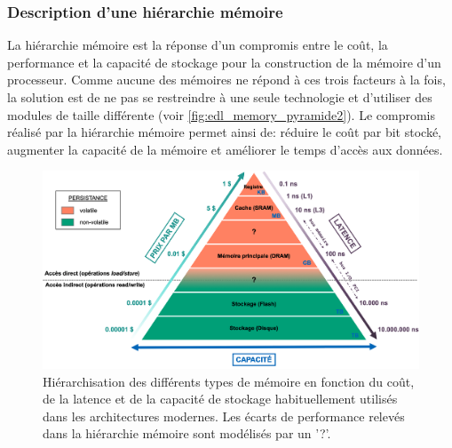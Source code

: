         
    \subsubsection{Description d'une hiérarchie mémoire} 
    
        
        La hiérarchie mémoire est la réponse d'un compromis entre le coût, la performance et la capacité de stockage pour la construction de la mémoire d'un processeur. Comme aucune des mémoires ne répond à ces trois facteurs à la fois, la solution est de ne pas se restreindre à  une seule technologie et d'utiliser des modules de taille différente (voir \autoref{fig:edl_memory_pyramide2}). Le compromis réalisé par la hiérarchie mémoire permet ainsi de: réduire le coût par bit stocké, augmenter la capacité de la mémoire et améliorer le temps d'accès aux données. 
        
        \begin{figure}
            \center
            \includegraphics[width=17cm]{images/edl_memory_pyramide.png}
            \caption{\label{fig:edl_memory_pyramide2} Hiérarchisation des différents types de mémoire en fonction du coût, de la latence et de la capacité de stockage habituellement utilisés dans les architectures modernes. Les écarts de performance relevés dans la hiérarchie mémoire sont modélisés par un '?'.}
        \end{figure}
        
